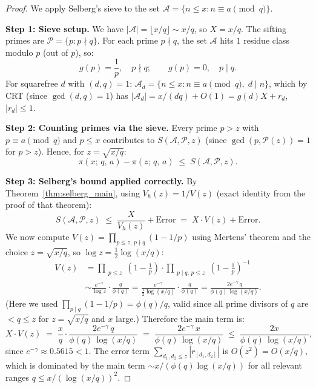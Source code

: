 \documentclass[12pt,a4paper]{amsart}
\theoremstyle{definition}
\begin{document}
\begin{proof}
  We apply Selberg's sieve to the set
  $\mathcal{A} = \{n \leq x : n \equiv a \pmod q\}$.

  \textbf{Step 1: Sieve setup.}
  We have $|\mathcal{A}| = \lfloor x/q \rfloor \sim x/q$, so $X = x/q$.
  The sifting primes are $\mathcal{P} = \{p : p \nmid q\}$.
  For each prime $p \nmid q$, the set $\mathcal{A}$ hits $1$ residue class
  modulo $p$ (out of $p$), so:
  \[
    g(p) = \frac{1}{p}, \quad p \nmid q; \qquad g(p) = 0, \quad p \mid q.
  \]
  For squarefree $d$ with $(d, q) = 1$:
  $\mathcal{A}_d = \{n \leq x : n \equiv a \pmod q,\; d \mid n\}$,
  which by CRT (since $\gcd(d,q)=1$) has
  $|\mathcal{A}_d| = x/(dq) + O(1) = g(d) X + r_d$, $|r_d| \leq 1$.

  \textbf{Step 2: Counting primes via the sieve.}
  Every prime $p > z$ with $p \equiv a \pmod q$ and $p \leq x$ contributes
  to $S(\mathcal{A},\mathcal{P},z)$ (since $\gcd(p, \mathcal{P}(z)) = 1$
  for $p > z$).  Hence, for $z = \sqrt{x/q}$:
  \[
    \pi(x;\,q,\,a) - \pi(z;\,q,\,a)
    \;\leq\; S(\mathcal{A},\mathcal{P},z).
  \]

  \textbf{Step 3: Selberg's bound applied correctly.}
  By Theorem~\ref{thm:selberg_main}, using $V_h(z) = 1/V(z)$ (exact identity
  from the proof of that theorem):
  \[
    S(\mathcal{A},\mathcal{P},z)
    \;\leq\; \frac{X}{V_h(z)} + \text{Error}
    \;=\; X \cdot V(z) + \text{Error}.
  \]
  We now compute $V(z) = \prod_{p \leq z,\, p \nmid q}(1 - 1/p)$ using Mertens'
  theorem and the choice $z = \sqrt{x/q}$, so $\log z = \tfrac{1}{2}\log(x/q)$:
  \begin{align*}
    V(z)
    &= \prod_{\substack{p \leq z}} \!\left(1 - \tfrac{1}{p}\right)
       \cdot \prod_{\substack{p \mid q,\, p \leq z}} \!\left(1 - \tfrac{1}{p}\right)^{-1} \\
    &\sim \frac{e^{-\gamma}}{\log z} \cdot \frac{q}{\phi(q)}
     = \frac{e^{-\gamma}}{\tfrac{1}{2}\log(x/q)} \cdot \frac{q}{\phi(q)}
     = \frac{2e^{-\gamma}\, q}{\phi(q)\,\log(x/q)}.
  \end{align*}
  (Here we used $\prod_{p \mid q}(1-1/p) = \phi(q)/q$, valid since all prime
  divisors of $q$ are $< q \leq z$ for $z = \sqrt{x/q}$ and $x$ large.)
  Therefore the main term is:
  \[
    X \cdot V(z)
    \;=\; \frac{x}{q} \cdot \frac{2e^{-\gamma}\,q}{\phi(q)\,\log(x/q)}
    \;=\; \frac{2e^{-\gamma}\,x}{\phi(q)\,\log(x/q)}
    \;\leq\; \frac{2x}{\phi(q)\,\log(x/q)},
  \]
  since $e^{-\gamma} \approx 0.5615 < 1$.
  The error term $\sum_{d_1,d_2 \leq z} |r_{[d_1,d_2]}|$ is $O(z^2) = O(x/q)$,
  which is dominated by the main term $\sim x/(\phi(q)\log(x/q))$
  for all relevant ranges $q \leq x/(\log(x/q))^2$.


\end{proof}
\end{document}

